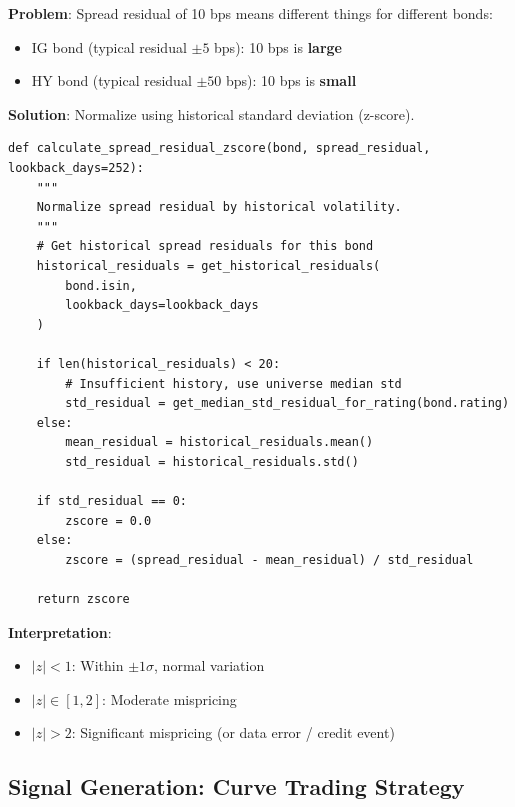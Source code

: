 \documentclass[11pt,a4paper]{article}
\begin{document}
\begin{implbox}
\textbf{Problem}: Spread residual of 10 bps means different things for different bonds:
\begin{itemize}
    \item IG bond (typical residual $\pm 5$ bps): 10 bps is \textbf{large}
    \item HY bond (typical residual $\pm 50$ bps): 10 bps is \textbf{small}
\end{itemize}

\textbf{Solution}: Normalize using historical standard deviation (z-score).

\begin{lstlisting}
def calculate_spread_residual_zscore(bond, spread_residual, lookback_days=252):
    """
    Normalize spread residual by historical volatility.
    """
    # Get historical spread residuals for this bond
    historical_residuals = get_historical_residuals(
        bond.isin,
        lookback_days=lookback_days
    )
    
    if len(historical_residuals) < 20:
        # Insufficient history, use universe median std
        std_residual = get_median_std_residual_for_rating(bond.rating)
    else:
        mean_residual = historical_residuals.mean()
        std_residual = historical_residuals.std()
    
    if std_residual == 0:
        zscore = 0.0
    else:
        zscore = (spread_residual - mean_residual) / std_residual
    
    return zscore
\end{lstlisting}

\textbf{Interpretation}:
\begin{itemize}
    \item $|z| < 1$: Within $\pm 1\sigma$, normal variation
    \item $|z| \in [1, 2]$: Moderate mispricing
    \item $|z| > 2$: Significant mispricing (or data error / credit event)
\end{itemize}
\end{implbox}

\subsection{Signal Generation: Curve Trading Strategy}
\end{document}
